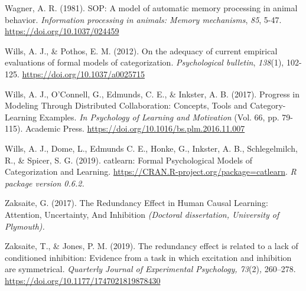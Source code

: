 \documentclass[twocolumn]{article}
\begin{document}
\begin{hangparas}{1em}{1}
Wagner, A. R. (1981). SOP: A model of automatic memory processing in
animal behavior. \emph{Information processing in animals: Memory
mechanisms}, \emph{85}, 5-47.
\href{https://doi.org/10.1037/024459}{https://doi.org/10.1037/024459 }

Wills, A. J., \& Pothos, E. M. (2012). On the adequacy of current
empirical evaluations of formal models of categorization.
\emph{Psychological bulletin}, \emph{138}(1), 102-125.
\url{https://doi.org/10.1037/a0025715}

Wills, A. J., O'Connell, G., Edmunds, C. E., \& Inkster, A. B. (2017).
Progress in Modeling Through Distributed Collaboration: Concepts, Tools
and Category-Learning Examples. \emph{In Psychology of Learning and
Motivation} (Vol. 66, pp. 79-115). Academic Press.
\url{https://doi.org/10.1016/bs.plm.2016.11.007}

Wills, A. J., Dome, L., Edmunds C. E., Honke, G., Inkster, A. B.,
Schlegelmilch, R., \& Spicer, S. G. (2019). catlearn: Formal
Psychological Models of Categorization and Learning.
\url{https://CRAN.R-project.org/package=catlearn}. \emph{R package
version 0.6.2.}

Zaksaite, G. (2017). The Redundancy Effect in Human Causal Learning:
Attention, Uncertainty, And Inhibition\emph{ (Doctoral dissertation,
University of Plymouth).}

Zaksaite, T., \& Jones, P. M. (2019). The redundancy effect is related
to a lack of conditioned inhibition: Evidence from a task in which
excitation and inhibition are symmetrical. \emph{Quarterly Journal of
Experimental Psychology, 73}(2)\emph{, }260--278.
\url{https://doi.org/10.1177/1747021819878430}

\end{hangparas}
\end{document}
